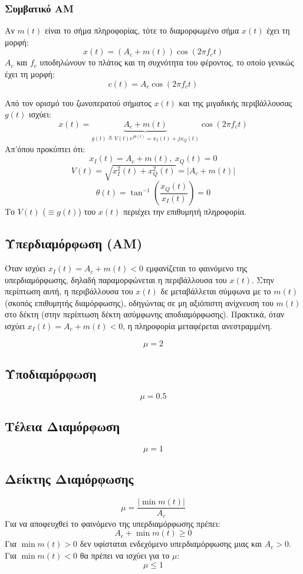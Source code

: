 \documentclass[a4paper,12pt]{article}
\begin{document}
\subsubsection*{Συμβατικό AM}
Αν \(m(t)\) είναι το σήμα πληροφορίας, τότε το διαμορφωμένο σήμα \(x(t)\) έχει τη μορφή:
\[
x(t)=(A_c+m(t))\cos(2\pi f_c t)
\]
\(A_c\) και \(f_c\) υποδηλώνουν το πλάτος και τη συχνότητα του φέροντος, το οποίο γενικώς έχει τη μορφή:
\[
c(t)=A_c \cos(2\pi f_c t)
\]

Από τον ορισμό του ζωνοπερατού σήματος \(x(t)\) και της μιγαδικής περιβάλλουσας \(g(t)\) ισχύει:
\[
x(t)=\underbrace{A_c+m(t)}_{g(t)\triangleq V(t)e^{j\theta(t)}=x_I(t)+jx_Q(t)} \cos(2\pi f_c t)
\]
Απ’όπου προκύπτει ότι:
\[
x_I(t)=A_c+m(t), \ x_Q(t)=0
\]
\[
V(t)=\sqrt{x_I^2(t)+x_Q^2(t)}=|A_c+m(t)|
\]
\[
\theta(t)=\tan^{-1} \left (\frac{x_Q(t)}{x_I(t)} \right)=0
\]
Το \(V(t)\) (\(\equiv g(t)\)) του \(x(t)\) περιέχει την επιθυμητή πληροφορία.

\subsection*{Υπερδιαμόρφωση (AM)}
Όταν ισχύει \(x_I(t)=A_c+m(t)<0\) εμφανίζεται το φαινόμενο της υπερδιαμόρφωσης, δηλαδή παραμορφώνεται η περιβάλλουσα του \(x(t)\). Στην περίπτωση αυτή, η περιβάλλουσα του \(x(t)\) δε μεταβάλλεται σύμφωνα με το \(m(t)\) (σκοπός επιθυμητής διαμόρφωσης), οδηγώντας σε μη αξιόπιστη ανίχνευση του \(m(t)\) στο δέκτη (στην περίπτωση δέκτη ασύμφωνης αποδιαμόρφωσης). Πρακτικά, όταν ισχύει \(x_I(t)=A_c+m(t)<0\), η πληροφορία μεταφέρεται ανεστραμμένη.

\[
\mu = 2
\]

\subsection*{Υποδιαμόρφωση}
\[
\mu=0.5
\]

\subsection*{Τέλεια Διαμόρφωση}
\[
\mu=1
\]

\subsection*{Δείκτης Διαμόρφωσης}
\[
\mu = \frac{|\min m(t)|}{A_c}
\]
Για να αποφευχθεί το φαινόμενο της υπερδιαμόρφωσης πρέπει:
\[
A_c+\min m(t) \geq 0
\]
Για \(\min m(t)>0\) δεν υφίσταται ενδεχόμενο υπερδιαμόρφωσης μιας και \(A_c>0\). Για \(\min m(t)<0\) θα πρέπει να ισχύει για το \(\mu\):
\[
\mu \leq 1
\]
\end{document}
